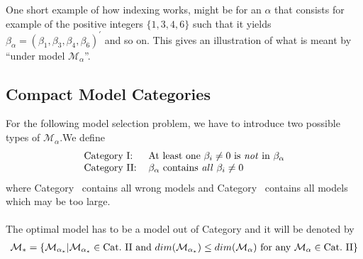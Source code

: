 \documentclass[Research_Module_ES.tex]{subfiles}
\begin{document}
One short example of how indexing works, might be for an $\alpha$ that consists for example of the positive integers $\{1,3,4,6\}$ such that it yields $\beta_\alpha=(\beta_1,\beta_3,\beta_4,\beta_6)^\prime$ and so on. This gives an illustration of what is meant by ``under model $\mathcal{M}_\alpha$''.

\subsection{Compact Model Categories} \label{chapter_compact_model}
For the following model selection problem, we have to introduce two possible types of $\mathcal{M}_\alpha$.We define
\begin{align*}
\begin{tabular}{ll}
Category~\RM{1}:& At least one $\beta_i\neq 0$ is \textit{not} in $\beta_\alpha$\\
Category~\RM{2}:& $\beta_\alpha$ contains \textit{all} $\beta_i\neq 0$
\end{tabular}
\end{align*}
where Category~ contains all wrong models and Category~ contains all models which may be too large.\\\\
The optimal model has to be a model out of Category  and it will be denoted by
\begin{align*}
\mathcal{M}_\ast=\{\mathcal{M}_{\alpha_\ast}|\mathcal{M}_{\alpha_\ast}\in \text{Cat.~\RM{2}~and~} dim(\mathcal{M}_{\alpha_\ast})\leq dim(\mathcal{M}_{\alpha})\text{~for~any~}\mathcal{M}_{\alpha}\in \text{Cat.~\RM{2}} \}
\end{align*}
\end{document}
